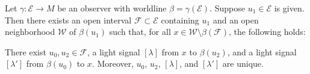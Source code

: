 Let $\gamma: \mathcal{E} \to M$ be an observer with worldline $\beta = \gamma(\mathcal{E})$. Suppose $u_1 \in \mathcal{E}$ is given. Then there exists an open interval $\mathcal{F} \subset \mathcal{E}$ containing $u_1$ and an open neighborhood $\mathcal{W}$ of $\beta(u_1)$ such that, for all $x \in \mathcal{W} \setminus \beta(\mathcal{F})$, the following holds:

There exist $u_0, u_2 \in \mathcal{F}$, a light signal $[\lambda]$ from $x$ to $\beta(u_2)$, and a light signal $[\lambda']$ from $\beta(u_0)$ to $x$. Moreover, $u_0$, $u_2$, $[\lambda]$, and $[\lambda']$ are unique.
